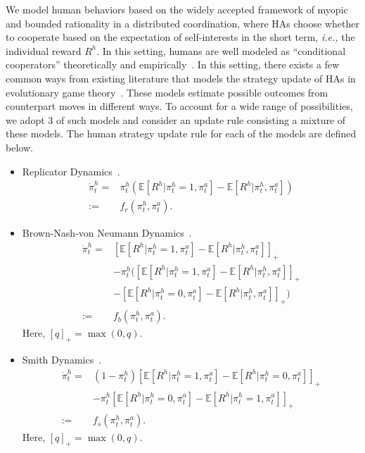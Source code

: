 \documentclass[letterpaper]{article} %
\newcommand{\ie}{\textit{i.e., }}
\begin{document}
We model human behaviors based on the widely accepted framework of myopic and bounded rationality in a distributed coordination, where HAs choose whether to cooperate based on the expectation of self-interests in the short term, \ie the individual reward $R^h$. In this setting, humans are well modeled as ``conditional cooperators'' theoretically and empirically~\cite{hilbe2013evolution,nowak2005evolution}. In this setting, there exists a few common ways from existing literature that models the strategy update of HAs in evolutionary game theory~\cite{Hofbauer1998-jg, Nowak2006-bl}. These models estimate possible outcomes from counterpart moves in different ways. To account for a wide range of possibilities, we adopt 3 of such models and consider an update rule consisting a mixture of these models. The human strategy update rule for each of the models are defined below.
\begin{itemize}
    \item Replicator Dynamics~\cite{replicator}.
    \begin{align} \label{eq:rep_dyn}
        \dot{\pi}^h_t=&\pi^h_t(\mathbb{E}[R^h|\pi^h_t=1,\pi^a_t]-\mathbb{E}[R^h|\pi^h_t,\pi^a_t])\nonumber\\
        :=&f_r(\pi^h_t,\pi^a_t).
    \end{align}
    \item Brown-Nash-von Neumann Dynamics~\cite{bnn}.
    \begin{align} \label{eq:bnn_dyn}
        \dot{\pi}^h_t=&[\mathbb{E}[R^h|\pi^h_t=1,\pi^a_t]-\mathbb{E}[R^h|\pi^h_t,\pi^a_t]]_+\nonumber\\
        &-\pi^h_t([\mathbb{E}[R^h|\pi^h_t=1,\pi^a_t]-\mathbb{E}[R^h|\pi^h_t,\pi^a_t]]_+\nonumber\\
        &-[\mathbb{E}[R^h|\pi^h_t=0,\pi^a_t]-\mathbb{E}[R^h|\pi^h_t,\pi^a_t]]_+)\nonumber\\
        :=&f_b(\pi^h_t,\pi^a_t).
    \end{align}
    Here, $[q]_+=\max(0,q)$.
    \item Smith Dynamics~\cite{smith}.
    \begin{align} \label{eq:smith_dyn}
        \dot{\pi}^h_t=&(1-\pi^h_t)[\mathbb{E}[R^h|\pi^h_t=1,\pi^a_t]-\mathbb{E}[R^h|\pi^h_t=0,\pi^a_t]]_+\nonumber\\
        &-\pi^h_t[\mathbb{E}[R^h|\pi^h_t=0,\pi^a_t]-\mathbb{E}[R^h|\pi^h_t=1,\pi^a_t]]_+\nonumber\\
        :=&f_s(\pi^h_t,\pi^a_t).
    \end{align}
    Here, $[q]_+=\max(0,q)$.
\end{itemize}
\end{document}

